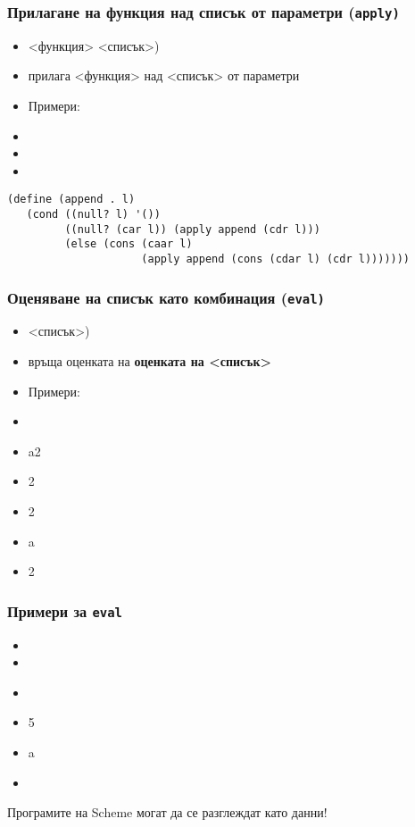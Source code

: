 \documentclass{beamer}
\begin{document}
\begin{frame}[fragile]
  \frametitle{Прилагане на функция над списък от параметри (\tt{apply})}

  \begin{itemize}[<+->]
  \item {}<функция> <списък>\tta)
  \item прилага <функция> над <списък> от параметри
  \item Примери:
  \item {}
  \item {}
  \item {}
  \end{itemize}
  \onslide<+->
\small
\begin{lstlisting}
(define (append . l)
   (cond ((null? l) '())
         ((null? (car l)) (apply append (cdr l)))
         (else (cons (caar l)
                     (apply append (cons (cdar l) (cdr l)))))))
\end{lstlisting}
\end{frame}

\begin{frame}
  \frametitle{Оценяване на списък като комбинация (\tt{eval})}

  \begin{itemize}[<+->]
  \item {}<списък>\tta)
  \item връща оценката на \textbf{оценката на <списък>}
  \item Примери:
  \item {}
  \item \evalsto a2
  \item {}2
  \item {}2
  \item {}a
  \item {}2
  \end{itemize}
\end{frame}

\begin{frame}
  \frametitle{Примери за \tt{eval}}

  \begin{itemize}[<+->]
  \item {}
  \item {}
  \item {} \eqv\ 
  \item {}5
  \item {\small {}a}
  \item {}
  \end{itemize}
  \onslide<+->
  \alert{Програмите на Scheme могат да се разглеждат като данни!}
\end{frame}
\end{document}
